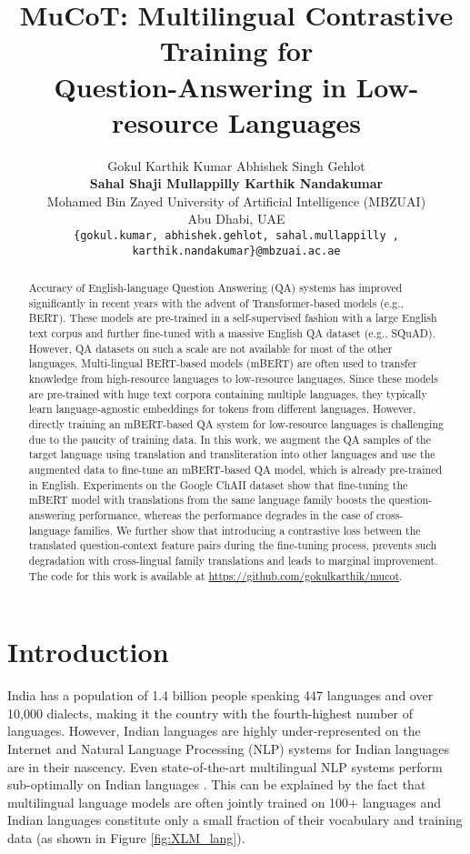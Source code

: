 \documentclass[11pt]{article}
\title{MuCoT: Multilingual Contrastive Training for \\ Question-Answering in Low-resource Languages}
\author{Gokul Karthik Kumar \quad Abhishek Singh Gehlot \\ \textbf{Sahal Shaji Mullappilly \quad Karthik Nandakumar}\\
 Mohamed Bin Zayed University of Artificial Intelligence (MBZUAI)\\
 Abu Dhabi, UAE\\
\tt\small{\{gokul.kumar, abhishek.gehlot, sahal.mullappilly , karthik.nandakumar\}@mbzuai.ac.ae} \\
}
\begin{document}
\maketitle
\begin{abstract}
Accuracy of English-language Question Answering (QA) systems has improved significantly in recent years with the advent of Transformer-based models (e.g., BERT). These models are pre-trained in a self-supervised fashion with a large English text corpus and further fine-tuned with a massive English QA dataset (e.g., SQuAD). However, QA datasets on such a scale are not available for most of the other languages. Multi-lingual BERT-based models (mBERT) are often used to transfer knowledge from high-resource languages to low-resource languages. Since these models are pre-trained with huge text corpora containing multiple languages, they typically learn language-agnostic embeddings for tokens from different languages. However, directly training an mBERT-based QA system for low-resource languages is challenging due to the paucity of training data. In this work, we augment the QA samples of the target language using translation and transliteration into other languages and use the augmented data to fine-tune an mBERT-based QA model, which is already pre-trained in English. Experiments on the Google ChAII dataset show that fine-tuning the mBERT model with translations from the same language family boosts the question-answering performance, whereas the performance degrades in the case of cross-language families. We further show that introducing a contrastive loss between the translated question-context feature pairs during the fine-tuning process, prevents such degradation with cross-lingual family translations and leads to marginal improvement. The code for this work is available at \url{https://github.com/gokulkarthik/mucot}.
\end{abstract}

\section{Introduction}

India has a population of 1.4 billion people speaking 447 languages and over 10,000 dialects, making it the country with the fourth-highest number of languages. However, Indian languages are highly under-represented on the Internet and Natural Language Processing (NLP) systems for Indian languages are in their nascency. Even state-of-the-art multilingual NLP systems perform sub-optimally on Indian languages \cite{ChAII}. This can be explained by the fact that multilingual language models are often jointly trained on 100+ languages and Indian languages constitute only a small fraction of their vocabulary and training data (as shown in Figure \ref{fig:XLM_lang}).
\end{document}
